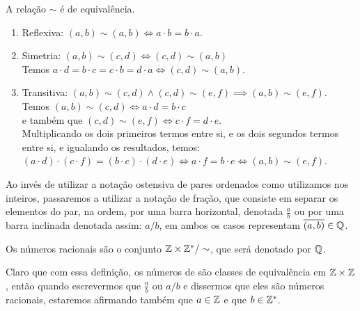 \documentclass[../main.tex]{subfiles}
\begin{document}
\begin{teo}
    A relação $\sim$ é de equivalência.
\end{teo}
\begin{dem}
    \begin{enumerate}[label=(\roman*)]
        \item Reflexiva: $\left( a,b \right) \sim \left( a,b \right) \iff a  \cdot b=b  \cdot a$.
        \item Simetria: $ \left( a ,b \right) \sim \left( c,d \right) \iff \left( c,d \right) \sim \left( a,b \right) $ \\
        Temos $ a  \cdot d = b  \cdot c = c  \cdot b = d  \cdot a \iff \left( c,d \right) \sim \left( a,b \right) $.
        \item Transitiva: $ \left( a,b \right) \sim \left( c,d \right) \land \left( c,d \right) \sim \left( e,f \right) \implies \left( a,b \right) \sim \left( e,f \right)$. \\
        Temos $\left( a,b \right) \sim \left( c,d \right) \iff a  \cdot d=b  \cdot c$ \\
        e também que $\left( c,d \right) \sim \left( e,f \right) \iff c  \cdot f=d  \cdot e$. \\
        Multiplicando os dois primeiros termos entre si, e os dois segundos termos entre si, e igualando os resultados, temos: \\ 
        $\left( a  \cdot d \right)  \cdot \left( c  \cdot f \right)= \left(b  \cdot c\right)  \cdot \left(d  \cdot e\right) \iff a  \cdot f = b  \cdot e \iff \left( a,b \right) \sim \left( e,f \right)$.
    \end{enumerate}
\end{dem}
\begin{obs}
    Ao invés de utilizar a notação ostensiva de pares ordenados como utilizamos nos inteiros, passaremos a utilizar a notação de fração, que consiste em separar os elementos do par, na ordem, por uma barra horizontal, denotada $\frac{a}{b}$ ou por uma barra inclinada denotada assim: $a/b$, em ambos os casos representam $\overline{\left( a,b \right)} \in \mathbb{Q}$. 
\end{obs}
\begin{defi}
   Os números racionais são o conjunto $\mathbb{Z} \times \mathbb{Z}^* / \sim$, que será denotado por $\mathbb{Q}$.
\end{defi}
Claro que com essa definição, os números de \Q são classes de equivalência em $\mathbb{Z} \times \mathbb{Z}$, então quando escrevermos que $\frac{a}{b}$ ou $a/b$ e dissermos que eles são números racionais, estaremos afirmando também que $a \in \mathbb{Z}$ e que $b \in \mathbb{Z}^*$.
\end{document}
